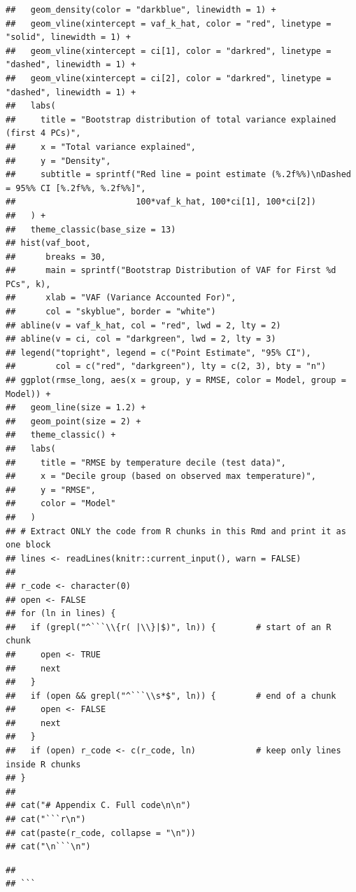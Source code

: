 \documentclass[
]{article}
\begin{document}
\begin{verbatim}
##   geom_density(color = "darkblue", linewidth = 1) +
##   geom_vline(xintercept = vaf_k_hat, color = "red", linetype = "solid", linewidth = 1) +
##   geom_vline(xintercept = ci[1], color = "darkred", linetype = "dashed", linewidth = 1) +
##   geom_vline(xintercept = ci[2], color = "darkred", linetype = "dashed", linewidth = 1) +
##   labs(
##     title = "Bootstrap distribution of total variance explained (first 4 PCs)",
##     x = "Total variance explained",
##     y = "Density",
##     subtitle = sprintf("Red line = point estimate (%.2f%%)\nDashed = 95%% CI [%.2f%%, %.2f%%]",
##                        100*vaf_k_hat, 100*ci[1], 100*ci[2])
##   ) +
##   theme_classic(base_size = 13)
## hist(vaf_boot,
##      breaks = 30,
##      main = sprintf("Bootstrap Distribution of VAF for First %d PCs", k),
##      xlab = "VAF (Variance Accounted For)",
##      col = "skyblue", border = "white")
## abline(v = vaf_k_hat, col = "red", lwd = 2, lty = 2)
## abline(v = ci, col = "darkgreen", lwd = 2, lty = 3)
## legend("topright", legend = c("Point Estimate", "95% CI"),
##        col = c("red", "darkgreen"), lty = c(2, 3), bty = "n")
## ggplot(rmse_long, aes(x = group, y = RMSE, color = Model, group = Model)) +
##   geom_line(size = 1.2) +
##   geom_point(size = 2) +
##   theme_classic() +
##   labs(
##     title = "RMSE by temperature decile (test data)",
##     x = "Decile group (based on observed max temperature)",
##     y = "RMSE",
##     color = "Model"
##   )
## # Extract ONLY the code from R chunks in this Rmd and print it as one block
## lines <- readLines(knitr::current_input(), warn = FALSE)
## 
## r_code <- character(0)
## open <- FALSE
## for (ln in lines) {
##   if (grepl("^```\\{r( |\\}|$)", ln)) {        # start of an R chunk
##     open <- TRUE
##     next
##   }
##   if (open && grepl("^```\\s*$", ln)) {        # end of a chunk
##     open <- FALSE
##     next
##   }
##   if (open) r_code <- c(r_code, ln)            # keep only lines inside R chunks
## }
## 
## cat("# Appendix C. Full code\n\n")
## cat("```r\n")
## cat(paste(r_code, collapse = "\n"))
## cat("\n```\n")
\end{verbatim}

\begin{verbatim}
## 
## ```
\end{verbatim}
\end{document}
